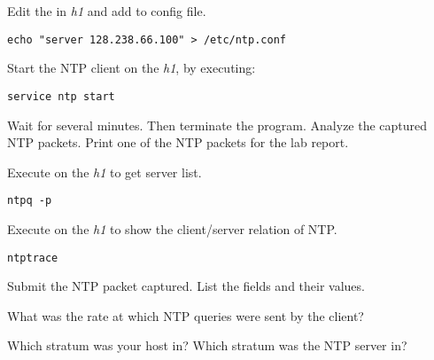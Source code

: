 \documentclass{../UTNetLab}
\begin{document}
Edit the  in \textit{h1} and add  to config file.

\begin{lstlisting}
echo "server 128.238.66.100" > /etc/ntp.conf
\end{lstlisting}

Start the NTP client on the \textit{h1}, by executing:

\begin{lstlisting}
service ntp start
\end{lstlisting}

Wait for several minutes.
Then terminate the  program.
Analyze the captured NTP packets.
Print one of the NTP packets for the lab report.

Execute  on the \textit{h1} to get  server list.

\begin{lstlisting}
ntpq -p
\end{lstlisting}

Execute  on the \textit{h1} to show the client/server relation of NTP.

\begin{lstlisting}
ntptrace
\end{lstlisting}


\begin{report}
    \item Submit the NTP packet captured.
    List the fields and their values.

    \item What was the rate at which NTP queries were sent by the client?

    \item Which stratum was your host in? Which stratum was the NTP server in?
\end{report}
\end{document}
